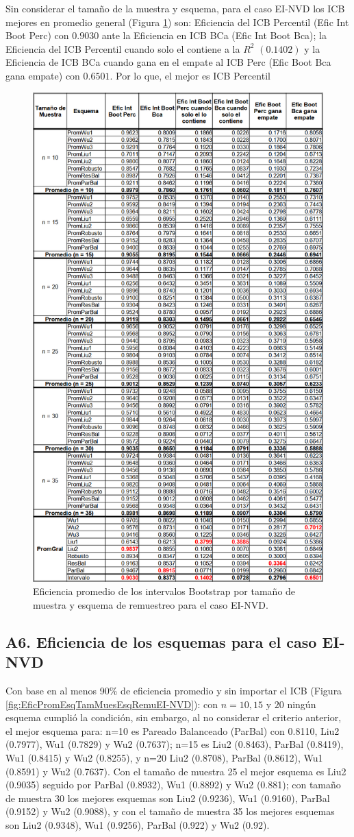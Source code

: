Sin considerar el tamaño de la muestra y esquema, para el caso EI-NVD los ICB mejores en promedio general  (Figura \ref{fig:EficPromIntBootsTamMuestEsqRemuEI-NVD}) son: Eficiencia del ICB Percentil (Efic Int Boot Perc) con $0.9030$ ante la Eficiencia en ICB BCa (Efic Int Boot Bca); la Eficiencia del ICB Percentil cuando solo el contiene a la $R^{2}$ $(0.1402)$ y la Eficiencia de ICB BCa cuando gana en el empate al ICB Perc (Efic Boot Bca gana empate) con $0.6501$. Por lo que, el mejor es ICB Percentil

\begin{figure}[ht] 
	\centering 
	\includegraphics[width=0.55\linewidth]{img/EI_NVD_Efic_Boots.png} 
	\caption{Eficiencia promedio de los intervalos Bootstrap por tamaño de muestra y esquema de remuestreo para el caso EI-NVD.} 
	\label{fig:EficPromIntBootsTamMuestEsqRemuEI-NVD}
\end{figure}
\FloatBarrier

\subsection*{A6. Eficiencia de los esquemas para el caso EI-NVD}


Con base en al menos 90\% de eficiencia promedio y sin importar el ICB (Figura \ref{fig:EficPromEsqTamMuesEsqRemuEI-NVD}): con $n=10, 15$ y $20$ ningún esquema cumplió la condición,
sin embargo, al no considerar el criterio anterior, el mejor esquema para: n=10 es Pareado Balanceado (ParBal) con 0.8110, Liu2 (0.7977), Wu1 (0.7829) y Wu2 (0.7637); n=15 es Liu2 (0.8463), ParBal (0.8419), Wu1 (0.8415) y Wu2 (0.8255), y n=20 Liu2 (0.8708), ParBal (0.8612), Wu1 (0.8591) y Wu2 (0.7637). Con el tamaño de muestra 25 el mejor esquema es Liu2 (0.9035) seguido por ParBal (0.8932), Wu1 (0.8892) y Wu2 (0.881); con tamaño de muestra 30 los mejores esquemas son Liu2 (0.9236),  Wu1 (0.9160), ParBal (0.9152) y Wu2 (0.9088), y con el tamaño de muestra 35 los mejores esquemas son Liu2 (0.9348),  Wu1 (0.9256), ParBal (0.922) y Wu2 (0.92).\\

